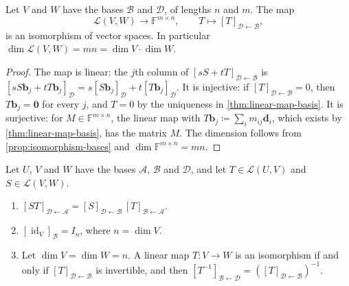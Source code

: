 \begin{theorem}
\label{thm:matrix-isomorphism}
Let $V$ and $W$ have the bases $\mathcal B$ and $\mathcal D$, of lengths $n$ and $m$. The map
\[
\mathcal L(V,W)\to\mathbb F^{m\times n},\qquad T\mapsto[T]_{\mathcal D\leftarrow\mathcal B},
\]
is an isomorphism of vector spaces. In particular $\dim\mathcal L(V,W)=mn=\dim V\cdot\dim W$.
\end{theorem}

\begin{proof}
The map is linear: the $j$th column of $[sS+tT]_{\mathcal D\leftarrow\mathcal B}$ is $[sS\mathbf b_j+tT\mathbf b_j]_{\mathcal D}=s[S\mathbf b_j]_{\mathcal D}+t[T\mathbf b_j]_{\mathcal D}$. It is injective: if $[T]_{\mathcal D\leftarrow\mathcal B}=0$, then $T\mathbf b_j=\mathbf 0$ for every $j$, and $T=0$ by the uniqueness in \cref{thm:linear-map-basis}. It is surjective: for $M\in\mathbb F^{m\times n}$, the linear map with $T\mathbf b_j\coloneqq\sum_im_{ij}\mathbf d_i$, which exists by \cref{thm:linear-map-basis}, has the matrix $M$. The dimension follows from \cref{prop:isomorphism-bases} and $\dim\mathbb F^{m\times n}=mn$.
\end{proof}

\begin{theorem}
\label{thm:composition-matrix}
Let $U$, $V$ and $W$ have the bases $\mathcal A$, $\mathcal B$ and $\mathcal D$, and let $T\in\mathcal L(U,V)$ and $S\in\mathcal L(V,W)$.
\begin{enumerate}
\item $[ST]_{\mathcal D\leftarrow\mathcal A}=[S]_{\mathcal D\leftarrow\mathcal B}\,[T]_{\mathcal B\leftarrow\mathcal A}$.
\item $[\operatorname{id}_V]_{\mathcal B}=I_n$, where $n=\dim V$.
\item Let $\dim V=\dim W=n$. A linear map $T\colon V\to W$ is an isomorphism if and only if $[T]_{\mathcal D\leftarrow\mathcal B}$ is invertible, and then $[T^{-1}]_{\mathcal B\leftarrow\mathcal D}=([T]_{\mathcal D\leftarrow\mathcal B})^{-1}$.
\end{enumerate}
\end{theorem}

